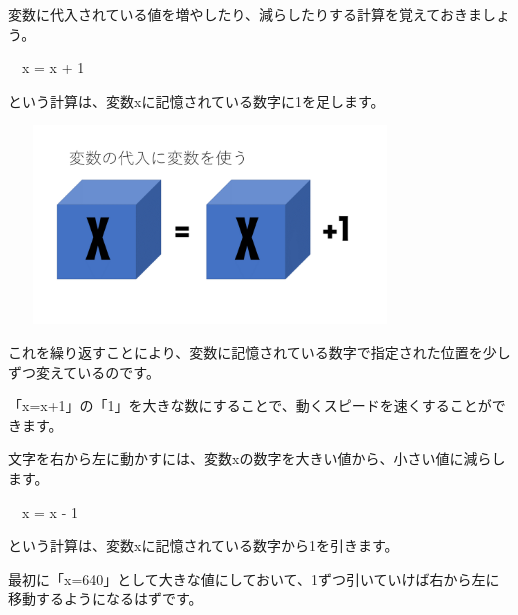 \documentclass[a4paper,dvipdfmx]{jarticle}
\begin{document}
変数に代入されている値を増やしたり、減らしたりする計算を覚えておきましょう。


\bigskip

\ \ x = x + 1


\bigskip

という計算は、変数xに記憶されている数字に1を足します。


\bigskip



\begin{center}
\includegraphics[width=10.689cm,height=5.265cm]{text02-img/text02-img051.png}

\end{center}

\bigskip


\bigskip


\bigskip


\bigskip


\bigskip


\bigskip


\bigskip


\bigskip


\bigskip


\bigskip


\bigskip


\bigskip

これを繰り返すことにより、変数に記憶されている数字で指定された位置を少しずつ変えているのです。

「x=x+1」の「1」を大きな数にすることで、動くスピードを速くすることができます。

文字を右から左に動かすには、変数xの数字を大きい値から、小さい値に減らします。


\bigskip

\ \ x = x - 1


\bigskip

という計算は、変数xに記憶されている数字から1を引きます。

最初に「x=640」として大きな値にしておいて、1ずつ引いていけば右から左に移動するようになるはずです。
\end{document}
